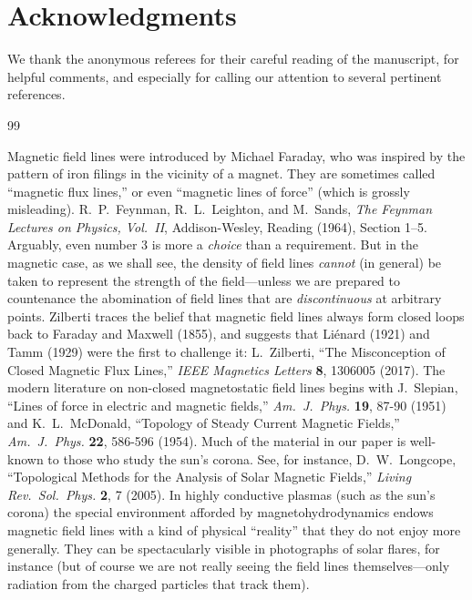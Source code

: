 \documentclass[aps,prb,twocolumn,groupedaddress,noshowpacs,checklength,amsmath]{revtex4-1}
\begin{document}
\section*{Acknowledgments}  
We thank the anonymous referees for their careful reading of the manuscript, for helpful comments, and especially for calling our attention to several pertinent references.



\begin{thebibliography}{99}

 Magnetic field lines were introduced by Michael Faraday, who was inspired by the pattern of iron filings in the vicinity of a magnet.  They are sometimes called ``magnetic flux lines,'' or even ``magnetic lines of force'' (which is grossly misleading).
 R.~P.~Feynman, R.~L.~Leighton, and M.~Sands, {\it The Feynman Lectures on Physics, Vol.~II}, Addison-Wesley, Reading (1964), Section 1--5.
  Arguably, even number 3 is more a {\it choice} than a requirement.  But in the magnetic case, as we shall see, the density of field lines {\it cannot} (in general) be taken to represent the strength of the field---unless we are prepared to countenance the abomination of field lines that are {\it discontinuous} at arbitrary points.
 Zilberti traces the belief that magnetic field lines always form closed loops back to Faraday and Maxwell (1855), and suggests that Li\'enard (1921) and Tamm (1929) were the first to challenge it:  L.~Zilberti, ``The Misconception of Closed Magnetic Flux Lines,'' {\it IEEE Magnetics Letters} {\bf 8}, 1306005 (2017).  The modern literature on non-closed magnetostatic field lines begins with J.~Slepian, ``Lines of force in electric and magnetic fields,'' {\it Am.~J.~Phys.} {\bf 19}, 87-90 (1951) and K.~L.~McDonald, ``Topology of Steady Current Magnetic Fields,''  {\it Am.~J.~Phys.} {\bf 22}, 586-596 (1954).  Much of the material in our paper is well-known to those who study the sun's corona.  See, for instance, D.~W.~Longcope, ``Topological Methods for the Analysis of Solar Magnetic Fields,'' {\it Living Rev.~Sol.~Phys.} {\bf 2}, 7 (2005).
 In highly conductive plasmas (such as the sun's corona) the special environment afforded by magnetohydrodynamics endows magnetic field lines with a kind of physical ``reality'' that they do not enjoy more generally.  They can be spectacularly visible in photographs of solar flares, for instance (but of course we are not really seeing the field lines themselves---only radiation from the charged particles that track them).

\end{thebibliography}
\end{document}
